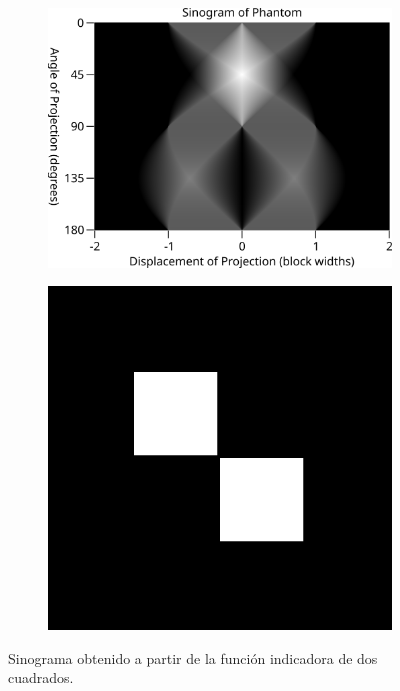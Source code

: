 \documentclass[11pt]{article}
\begin{document}
\begin{figure}[H]
\centering
\begin{subfigure}[b]{0.47\textwidth}
  \includegraphics[width=\linewidth]{figures/Sinogram_-_Two_Square_Indicator_Phantom.svg.png}
  \caption{}
\end{subfigure}\hfill
\begin{subfigure}[b]{0.47\textwidth}
  \includegraphics[width=\linewidth]{figures/Sinogram_Source_-_Two_Squares_Phantom.svg.png}
  \caption{}
\end{subfigure}
\caption{Sinograma obtenido a partir de la función indicadora de dos cuadrados.}
\end{figure}
\FloatBarrier
\end{document}
